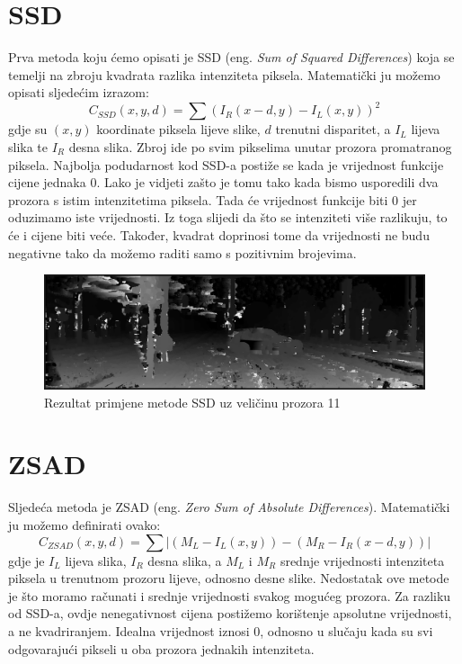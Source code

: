 \documentclass[utf8, zavrsni, numeric]{fer}
\begin{document}
\section{SSD}

Prva metoda koju ćemo opisati je SSD ({eng. \sl Sum of Squared Differences}) koja se temelji na zbroju kvadrata razlika intenziteta piksela.
Matematički ju možemo opisati sljedećim izrazom:
\[
C_{SSD}(x, y, d) = \sum(I_R(x - d, y) - I_L(x, y))^2
\]
gdje su $(x, y)$ koordinate piksela lijeve slike, $d$ trenutni disparitet, a $I_L$ lijeva slika te $I_R$ desna slika. Zbroj ide po svim pikselima unutar prozora promatranog piksela.
Najbolja podudarnost kod SSD-a postiže se kada je vrijednost funkcije cijene jednaka $0$. Lako je vidjeti zašto je tomu tako kada bismo usporedili dva prozora s istim intenzitetima piksela. Tada će vrijednost funkcije biti $0$ jer oduzimamo iste vrijednosti. Iz toga slijedi da što se intenziteti više razlikuju, to će i cijene biti veće. Također, kvadrat doprinosi tome da vrijednosti ne budu negativne tako da možemo raditi samo s pozitivnim brojevima.

\begin{figure}[htb]
  \centering
  \includegraphics[width=14cm]{img/local_000046_10_SSD_11_140_scaled.png}
  \caption{Rezultat primjene metode SSD uz veličinu prozora 11}
  \label{fig:SSD-KITTI}
\end{figure}

\section{ZSAD}

Sljedeća metoda je ZSAD ({eng. \sl Zero Sum of Absolute Differences}). Matematički ju možemo definirati ovako:
\[
C_{ZSAD}(x, y, d) = \sum\lvert(M_L - I_L(x, y)) - (M_R - I_R(x - d, y))\rvert
\]
gdje je $I_L$ lijeva slika, $I_R$ desna slika, a $M_L$ i $M_R$ srednje vrijednosti intenziteta piksela u trenutnom prozoru lijeve, odnosno desne slike.
Nedostatak ove metode je što moramo računati i srednje vrijednosti svakog mogućeg prozora. Za razliku od SSD-a, ovdje nenegativnost cijena postižemo korištenje apsolutne vrijednosti, a ne kvadriranjem. Idealna vrijednost iznosi 0, odnosno u slučaju kada su svi odgovarajući pikseli u oba
prozora jednakih intenziteta.
\end{document}
